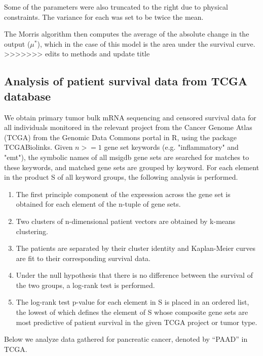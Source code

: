\documentclass[11pt]{article}
\newcommand{\tcr} { \textcolor{red} }
\begin{document}
Some of the parameters were also truncated to the right due to physical constraints.
The variance for each was set to be twice the mean.
\par
The Morris algorithm then computes the average of the absolute change in the output ($\mu^*$), which in the case of this model is the area under the survival curve.
>>>>>>> edits to methods and update title


\subsection{Analysis of patient survival data from TCGA database}
We obtain primary tumor bulk mRNA sequencing and censored survival data for all individuals monitored in the relevant project from the Cancer Genome Atlas (TCGA) from the Genomic Data Commons portal in R, using the package TCGABiolinks.  Given $n >= 1$ gene set keywords (e.g. "inflammatory" and "emt"), the symbolic names of all msigdb gene sets are searched for matches to these keywords, and matched gene sets are grouped by keyword. For each element in the product S of all keyword groups, the following analysis is performed.
\begin{enumerate}
     \item The first principle component of the expression across the gene set is obtained for each element of the n-tuple of gene sets.
     \item Two clusters of n-dimensional patient vectors are obtained by k-means clustering.
     \item The patients are separated by their cluster identity and Kaplan-Meier curves are fit to their corresponding survival data.
     \item Under the null hypothesis that there is no difference between the survival of the two groups, a log-rank test is performed.
     \item The log-rank test p-value for each element in S is placed in an ordered list, the lowest of which defines the element of S whose composite gene sets are most predictive of patient survival in the given TCGA project or tumor type.
\end{enumerate}
Below we analyze data gathered for pancreatic cancer, denoted by ``PAAD'' in TCGA.     
\end{document}
